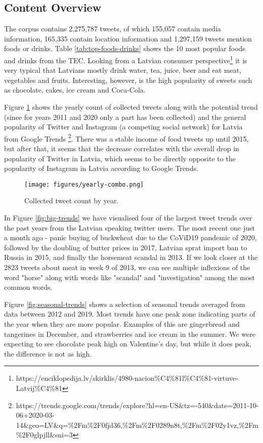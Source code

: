 \documentclass{IOS-Book-Article}
\begin{document}
\subsection{Content Overview}

The corpus contains 2,275,787 tweets, of which 155,057 contain media information, 165,335 contain location information and 1,297,159 tweets mention foods or drinks.
Table \ref{tab:top-foods-drinks} shows the 10 most popular foods and drinks from the TEC. Looking from a Latvian consumer perspective\footnote{https://enciklopedija.lv/skirklis/4980-nacion\%C4\%81l\%C4\%81-virtuve-Latvij\%C4\%81} it is very typical that Latvians mostly drink water, tea, juice, beer and eat meat, vegetables and fruits. Interesting, however, is the high popularity of sweets such as chocolate, cakes, ice cream and Coca-Cola.

Figure \ref{fig:yearly-counts} shows the yearly count of collected tweets along with the potential trend (since for years 2011 and 2020 only a part has been collected) and the general popularity of Twitter and Instagram (a competing social network) for Latvia from Google Trends \footnote{https://trends.google.com/trends/explore?hl=en-US\&tz=-540\&date=2011-10-06+2020-03-14\&geo=LV\&q=\%2Fm\%2F0fjd36,\%2Fm\%2F0289n8t,\%2Fm\%2F02y1vz,\%2Fm\%2F0glpjll\&sni=3}. There was a stable income of food tweets up until 2015, but after that, it seems that the decrease correlates with the overall drop in popularity of Twitter in Latvia, which seems to be directly opposite to the popularity of Instagram in Latvia according to Google Trends.

\begin{figure}[b]
    \texttt{[image: figures/yearly-combo.png]}
    \caption{Collected tweet count by year.}
    \label{fig:yearly-counts}
\end{figure}

In Figure \ref{fig:big-trends} we have visualised four of the largest tweet trends over the past years from the Latvian speaking twitter users. The most recent one just a month ago - panic buying of buckwheat due to the CoViD19 pandemic of 2020, followed by the doubling of butter prices in 2017, Latvian sprat import ban to Russia in 2015, and finally the horsemeat scandal in 2013. If we look closer at the 2823 tweets about meat in week 9 of 2013, we can see multiple inflexions of the word "horse" along with words like "scandal" and "investigation" among the most common words.

Figure \ref{fig:seasonal-trends} shows a selection of seasonal trends averaged from data between 2012 and 2019. Most trends have one peak zone indicating parts of the year when they are more popular. Examples of this are gingerbread and tangerines in December, and strawberries and ice cream in the summer. We were expecting to see chocolate peak high on Valentine's day, but while it does peak, the difference is not as high.
\end{document}
